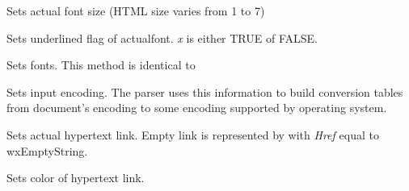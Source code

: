 \label{wxhtmlwinparsersetfontsize}


Sets actual font size (HTML size varies from 1 to 7)

\label{wxhtmlwinparsersetfontunderlined}


Sets underlined flag of actualfont. {\it x} is either TRUE of FALSE.

\label{wxhtmlwinparsersetfonts}


Sets fonts. This method is identical to 


\label{wxhtmlwinparsersetinputencoding}


Sets input encoding. The parser uses this information to build conversion
tables from document's encoding to some encoding supported by operating
system.


\label{wxhtmlwinparsersetlink}


Sets actual hypertext link. Empty link is represented
by  with {\it Href} equal
to wxEmptyString.

\label{wxhtmlwinparsersetlinkcolor}


Sets color of hypertext link.



